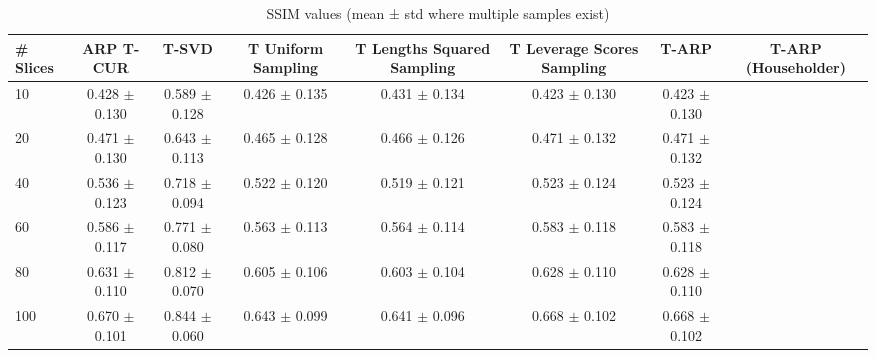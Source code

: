 \begin{table}
\caption{SSIM values (mean ± std where multiple samples exist)}
\label{tab:ssim}
\begin{tabular}{lccccccc}
\toprule
# Slices & ARP T-CUR & T-SVD & T Uniform Sampling & T Lengths Squared Sampling & T Leverage Scores Sampling & T-ARP & T-ARP (Householder) \\
\midrule
10 & 0.428 $\pm$ 0.130 & 0.589 $\pm$ 0.128 & 0.426 $\pm$ 0.135 & 0.431 $\pm$ 0.134 & 0.423 $\pm$ 0.130 & 0.423 $\pm$ 0.130 \\
20 & 0.471 $\pm$ 0.130 & 0.643 $\pm$ 0.113 & 0.465 $\pm$ 0.128 & 0.466 $\pm$ 0.126 & 0.471 $\pm$ 0.132 & 0.471 $\pm$ 0.132 \\
40 & 0.536 $\pm$ 0.123 & 0.718 $\pm$ 0.094 & 0.522 $\pm$ 0.120 & 0.519 $\pm$ 0.121 & 0.523 $\pm$ 0.124 & 0.523 $\pm$ 0.124 \\
60 & 0.586 $\pm$ 0.117 & 0.771 $\pm$ 0.080 & 0.563 $\pm$ 0.113 & 0.564 $\pm$ 0.114 & 0.583 $\pm$ 0.118 & 0.583 $\pm$ 0.118 \\
80 & 0.631 $\pm$ 0.110 & 0.812 $\pm$ 0.070 & 0.605 $\pm$ 0.106 & 0.603 $\pm$ 0.104 & 0.628 $\pm$ 0.110 & 0.628 $\pm$ 0.110 \\
100 & 0.670 $\pm$ 0.101 & 0.844 $\pm$ 0.060 & 0.643 $\pm$ 0.099 & 0.641 $\pm$ 0.096 & 0.668 $\pm$ 0.102 & 0.668 $\pm$ 0.102 \\
\bottomrule
\end{tabular}
\end{table}
